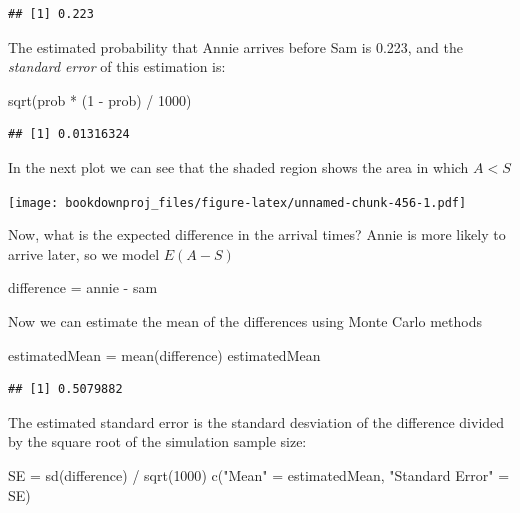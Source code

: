 \documentclass[
]{book}
\newenvironment{Shaded}{\begin{snugshade}}{\end{snugshade}}
\newcommand{\DecValTok}[1]{\textcolor[rgb]{0.00,0.00,0.81}{#1}}
\newcommand{\FunctionTok}[1]{\textcolor[rgb]{0.00,0.00,0.00}{#1}}
\newcommand{\NormalTok}[1]{#1}
\newcommand{\OtherTok}[1]{\textcolor[rgb]{0.56,0.35,0.01}{#1}}
\newcommand{\SpecialCharTok}[1]{\textcolor[rgb]{0.00,0.00,0.00}{#1}}
\newcommand{\StringTok}[1]{\textcolor[rgb]{0.31,0.60,0.02}{#1}}
\begin{document}
\begin{verbatim}
## [1] 0.223
\end{verbatim}

The estimated probability that Annie arrives before Sam is 0.223, and the \emph{standard error} of this estimation is:

\begin{Shaded}
\begin{Highlighting}[]
\FunctionTok{sqrt}\NormalTok{(prob }\SpecialCharTok{*}\NormalTok{ (}\DecValTok{1} \SpecialCharTok{{-}}\NormalTok{ prob) }\SpecialCharTok{/} \DecValTok{1000}\NormalTok{)}
\end{Highlighting}
\end{Shaded}

\begin{verbatim}
## [1] 0.01316324
\end{verbatim}

In the next plot we can see that the shaded region shows the area in which \(A < S\)

\texttt{[image: bookdownproj\_files/figure-latex/unnamed-chunk-456-1.pdf]}

Now, what is the expected difference in the arrival times? Annie is more likely to arrive later, so we model \(E(A-S)\)

\begin{Shaded}
\begin{Highlighting}[]
\NormalTok{difference }\OtherTok{=}\NormalTok{ annie }\SpecialCharTok{{-}}\NormalTok{ sam}
\end{Highlighting}
\end{Shaded}

Now we can estimate the mean of the differences using Monte Carlo methods

\begin{Shaded}
\begin{Highlighting}[]
\NormalTok{estimatedMean }\OtherTok{=} \FunctionTok{mean}\NormalTok{(difference)}
\NormalTok{estimatedMean}
\end{Highlighting}
\end{Shaded}

\begin{verbatim}
## [1] 0.5079882
\end{verbatim}

The estimated standard error is the standard desviation of the difference divided by the square root of the simulation sample size:

\begin{Shaded}
\begin{Highlighting}[]
\NormalTok{SE }\OtherTok{=} \FunctionTok{sd}\NormalTok{(difference) }\SpecialCharTok{/} \FunctionTok{sqrt}\NormalTok{(}\DecValTok{1000}\NormalTok{)}
\FunctionTok{c}\NormalTok{(}\StringTok{"Mean"} \OtherTok{=}\NormalTok{ estimatedMean, }\StringTok{"Standard Error"} \OtherTok{=}\NormalTok{ SE)}
\end{Highlighting}
\end{Shaded}
\end{document}
